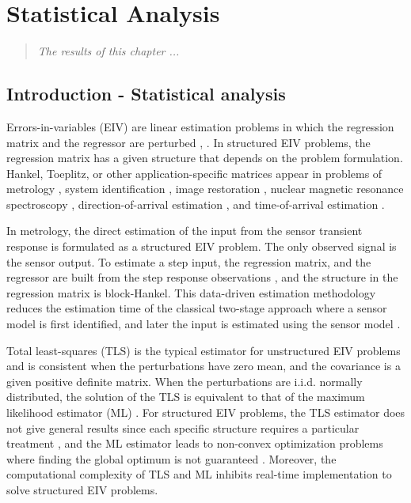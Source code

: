 
\glsresetall

\chapter{Statistical Analysis}\label{chap:StatisticalAnalysis}
\begin{quote}
\emph{The results of this chapter ...}\vfill{}
\end{quote}



\section{Introduction  - Statistical analysis}


Errors-in-variables (EIV) are linear estimation problems in which the regression matrix and the regressor are perturbed \cite{VanHuffel91Book}, \cite{Markovsky07overview}.
In structured EIV problems, the regression matrix has a given structure that depends on the problem formulation.
Hankel, Toeplitz, or other application-specific matrices appear in problems of metrology \cite{Markovsky15cep}, system identification \cite{Soderstrom07}, image restoration \cite{Feiz17}, nuclear magnetic resonance spectroscopy \cite{Cai16}, direction-of-arrival estimation \cite{Pan18}, and time-of-arrival estimation \cite{Jia18}.

In metrology, the direct estimation of the input from the sensor transient response is formulated as a structured EIV problem.
The only observed signal is the sensor output.
To estimate a step input, the regression matrix, and the regressor are built from the step response observations \cite{Markovsky15cep}, and
the structure in the regression matrix is block-Hankel.
This data-driven estimation methodology reduces the estimation time of the classical two-stage approach where a sensor model is first identified, and later the input is estimated using the sensor model \cite{Azam15, Niedzwiecki16a}.

Total least-squares (TLS) is the typical estimator for unstructured EIV problems and is consistent when the perturbations have zero mean, and the covariance is a given positive definite matrix.
When the perturbations are i.i.d. normally distributed, the solution of the TLS is equivalent to that of the maximum likelihood estimator (ML) \cite{Markovsky07overview}. 
For structured EIV problems, the TLS estimator does not give general results since each specific structure requires a particular treatment \cite{VanHuffel07TLSeditorial}, and the ML estimator leads to non-convex optimization problems where finding the global optimum is not guaranteed \cite{Rhode14recursive}.
Moreover, the computational complexity of TLS and ML inhibits real-time implementation to solve structured EIV problems. 

